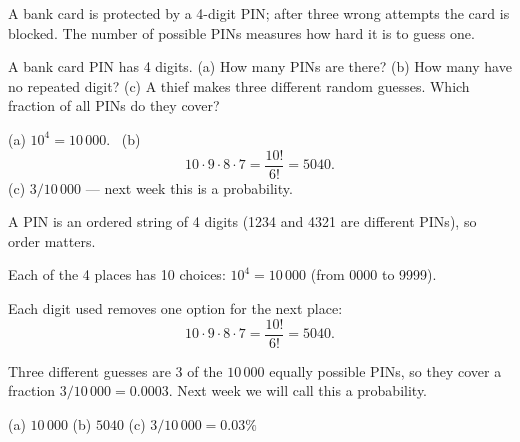 
\begin{problem}
	\begin{context}
		A bank card is protected by a 4-digit PIN; after three wrong attempts the
		card is blocked. The number of possible PINs measures how hard it is to
		guess one.
	\end{context}
	A bank card PIN has 4 digits. (a) How many PINs are there? (b) How many
	have no repeated digit? (c) A thief makes three different random guesses.
	Which fraction of all PINs do they cover?
\end{problem}

\begin{slides}
	\small
	\exstatement
	\pause
	\sol (a) $10^4=10\,000$. \ (b)
	\[ 10\cdot9\cdot8\cdot7=\frac{10!}{6!}=5040. \]
	(c) $3/10\,000$ --- next week this is a probability.
\end{slides}

\begin{solution}
	\idea A PIN is an ordered string of 4 digits (1234 and 4321 are different
	PINs), so order matters.

	 Each of the 4 places has 10 choices: $10^4=10\,000$ (from 0000 to
	9999).

	 Each digit used removes one option for the next place:
	\[ 10\cdot9\cdot8\cdot7=\frac{10!}{6!}=5040. \]

	 Three different guesses are 3 of the $10\,000$ equally possible
	PINs, so they cover a fraction $3/10\,000 = 0.0003$. Next week we will call
	this a probability.

	\begin{answer}
		(a) $10\,000$ \qquad (b) $5040$ \qquad (c) $3/10\,000=0.03\%$
	\end{answer}
\end{solution}
